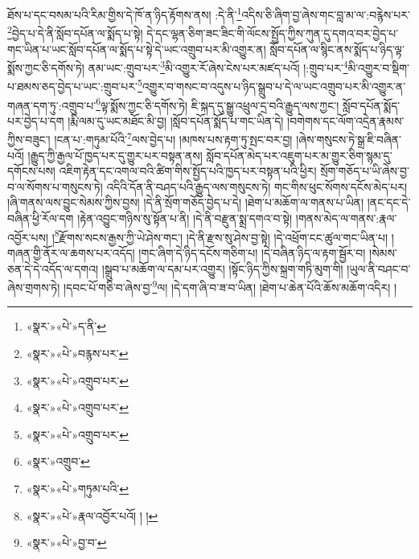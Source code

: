 ཐོས་པ་དང་བསམ་པའི་རིམ་གྱིས་དེ་ཁོ་ན་ཉིད་རྟོགས་ནས། :དེ་ནི་\footnote{«སྣར་»«པེ་»ད་ནི་}འདིས་ཅི་ཞིག་བྱ་ཞེས་གང་བླ་མ་ལ་:བརྙེས་པར་\footnote{«སྣར་»«པེ་»བརྙས་པར་}བྱེད་པ་དེ་ནི་སློབ་དཔོན་ལ་སྨོད་པ་སྟེ། དེ་དང་ལྷན་ཅིག་ཟང་ཟིང་གི་ལོངས་སྤྱོད་ཀྱིས་ཀུན་དུ་དགའ་བར་བྱེད་པ་གང་ཡིན་པ་ཡང་སློབ་དཔོན་ལ་སྨོད་པ་སྟེ་དེ་ཡང་འགྲུབ་པར་མི་འགྱུར་ན། སློབ་དཔོན་ལ་སྙིང་ནས་སྨོད་པ་ཉིད་ལྟ་སྨོས་ཀྱང་ཅི་དགོས་ཏེ། ནམ་ཡང་:གྲུབ་པར་\footnote{«སྣར་»«པེ་»འགྲུབ་པར་}མི་འགྱུར་རོ་ཞེས་ངེས་པར་མཛད་པའོ། །:གྲུབ་པར་\footnote{«སྣར་»«པེ་»འགྲུབ་པར་}མི་འགྱུར་བ་སྡིག་པ་ཐམས་ཅད་བྱེད་པ་ཡང་:གྲུབ་པར་\footnote{«སྣར་»«པེ་»འགྲུབ་པར་}འགྱུར་བ་གསང་བ་འདུས་པ་ཉིད་སྒྲུབ་པ་དེ་ལ་ཡང་འགྲུབ་པར་མི་འགྱུར་ན་གཞན་དག་ཏུ་:འགྲུབ་པ་\footnote{«སྣར་»འགྲུབ་}ལྟ་སྨོས་ཀྱང་ཅི་དགོས་ཏེ། ཇི་སྐད་དུ་སྒྱུ་འཕྲུལ་དྲ་བའི་རྒྱུད་ལས་ཀྱང་། སློབ་དཔོན་སྨོད་པར་བྱེད་པ་དག །རྨི་ལམ་དུ་ཡང་མཐོང་མི་བྱ། །སློབ་དཔོན་སྨོད་པ་གང་ཡིན་དེ། །བགེགས་དང་ལོག་འདྲེན་རྣམས་ཀྱིས་བཟུང་། །ངན་པ་:གཏུམ་པོའི་\footnote{«སྣར་»«པེ་»གཏུམ་པའི་}ལས་བྱེད་པ། །མཁས་པས་རྟག་ཏུ་སྤང་བར་བྱ། །ཞེས་གསུངས་ཏེ་སྒྲ་ཇི་བཞིན་པའོ། །རྒྱུད་ཀྱི་རྒྱལ་པོ་ཁྱད་པར་དུ་གྱུར་པར་བསྟན་ནས། སློབ་དཔོན་མེད་པར་འཇུག་པར་མ་གྱུར་ཅིག་སྙམ་དུ་དགོངས་པས། འཇིག་རྟེན་དང་འགལ་བའི་ཚིག་གིས་སྤྱོད་པའི་ཁྱད་པར་བསྟན་པའི་ཕྱིར། སྲོག་གཅོད་པ་ཡི་ཞེས་བྱ་བ་ལ་སོགས་པ་གསུངས་ཏེ། འདིའི་དོན་ནི་བཤད་པའི་རྒྱུད་ལས་གསུངས་ཏེ། གང་གིས་ཕུང་སོགས་དངོས་མེད་པར། །ཞི་གནས་ལས་བྱུང་སེམས་ཀྱིས་བྱས། །དེ་ནི་སྲོག་གཅོད་བྱེད་པ་དེ། །ཐེག་པ་མཆོག་ལ་གནས་པ་ཡིན། །ནང་དང་དེ་བཞིན་ཕྱི་རོལ་དག །རྟེན་འབྱུང་གཉིས་སུ་སྟོན་པ་ནི། །དེ་ནི་བརྫུན་སྨྲ་དགའ་བ་སྟེ། །གནས་མེད་ལ་གནས་:རྣལ་འབྱོར་པས། །\footnote{«སྣར་»«པེ་»རྣལ་འབྱོར་པའོ། ། །}རྫོགས་སངས་རྒྱས་ཀྱི་ཡེ་ཤེས་གང་། །དེ་ནི་རྫས་སུ་ཤེས་བྱ་སྟེ། །དེ་འཕྲོག་ངང་ཚུལ་གང་ཡིན་པ། །གཞན་གྱི་ནོར་ལ་ཆགས་པར་འདོད། །གང་ཞིག་དེ་ཉིད་དངོས་གཅིག་པ། །དེ་བཞིན་ཉིད་ལ་རྟག་སྦྱོར་བ། །སེམས་ཅན་དེ་དེ་འདོད་ལ་དགའ། །སྒྲུབ་པ་མཆོག་ལ་དམ་པར་འགྱུར། །སྟོང་ཉིད་ཀྱིས་སྐྲག་གཏི་མུག་གི། །ཡུལ་ནི་བཤང་བ་ཞེས་གྲགས་ཏེ། །དབང་པོ་གཅི་བ་ཞེས་བྱ་\footnote{«སྣར་»«པེ་»བྱ་བ་}ལ། །དེ་དག་ཞི་བ་ཟ་བ་ཡིན། །ཐེག་པ་ཆེན་པོའི་ཆོས་མཆོག་འདིར། །

